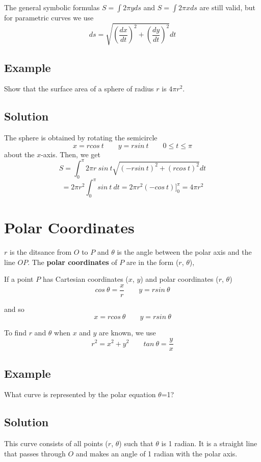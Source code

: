 The general symbolic formulas $S=\int 2 \pi y ds$ and $S = \int 2 \pi x ds$
are still valid, but for parametric curves we use
$$ ds = \sqrt{\left(\frac{dx}{dt}\right)^2+\left(\frac{dy}{dt}\right)^2} dt $$

\subsection*{Example}
Show that the surface area of a sphere of radius $r$ is $4\pi r^2$.

\subsection*{Solution}
The sphere is obtained by rotating the semicircle
$$x=rcos\:t \qquad y=rsin\:t \qquad 0\leq t\leq \pi$$
about the $x$-axis. Then, we get
$$S=\int_0^\pi 2\pi r\: sin\:t\sqrt{(-rsin\:t)^2+(rcos\:t)^2}dt$$
$$=2\pi r^2\int_0^\pi sin\:t\:dt = 2\pi r^2(-cos\:t)]_0^\pi = 4\pi r^2$$

\section{Polar Coordinates}
$r$ is the ditsance from $O$ to $P$ and $\theta$ is the angle between the polar axis
and the line $OP$. The \textbf{polar coordinates} of $P$ are in the form ($r$, $\theta$), \par

If a point $P$ has Cartesian coordinates ($x$, $y$) and polar coordinates ($r$, $\theta$)
$$ cos \: \theta = \frac{x}{r} \qquad y = r sin \: \theta $$

and so
$$ x=r cos \: \theta \qquad y = r sin \: \theta$$

To find $r$ and $\theta$ when $x$ and $y$ are known, we use
$$ r^2 = x^2 + y^2 \qquad tan \: \theta = \frac{y}{x} $$

\subsection*{Example}
What curve is represented by the polar equation $\theta$=1?

\subsection*{Solution}
This curve consists of all points ($r$, $\theta$) such that $\theta$ is 1 radian.
It is a straight line that passes through $O$ and makes an angle of 1 radian with
the polar axis.

